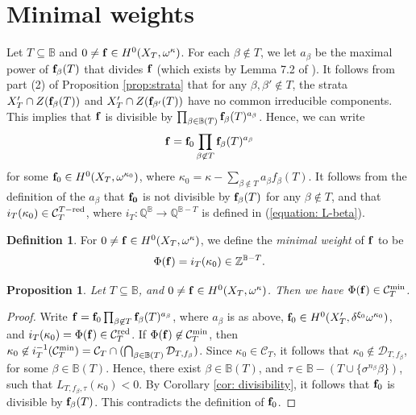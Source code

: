 \documentclass[11pt,pdflatex]{amsart}
\theoremstyle{plain}
\theoremstyle{definition}
\newcommand{\QQ}{\mathbf{Q}}
\newcommand{\ZZ}{\mathbf{Z}}
\theoremstyle{plain}
\newtheorem{prop}[theorem]{Proposition}
\theoremstyle{definition}
\newtheorem{dfn}[theorem]{Definition}
\theoremstyle{remark}
\numberwithin{equation}{section}
\numberwithin{figure}{section} \numberwithin{table}{subsection}
\newcommand{\calC}{{\mathcal{C}}}
\newcommand{\calD}{{\mathcal{D}}}
\def\BB{\mathbb{B}}
\def\QQ{\mathbb{Q}}
\def\ZZ{\mathbb{Z}}
\begin{document}
\section{Minimal weights}


 Let $T \subseteq \BB$ and $0 \neq {\bf f} \in H^0(X_T,\omega^\kappa)$. For each $\beta \not\in T$, we let $a_\beta$ be the maximal power of ${\bf f}_\beta(T)$ that divides $\bf f$ (which exists by Lemma 7.2 of \cite{DK2}).   
It follows from part (2) of Proposition \ref{prop:strata} that for any $\beta,\beta' \not\in T$, the strata $X'_T \cap Z({\bf f}_\beta(T))$ and $X'_T \cap Z({\bf f}_{\beta'}(T))$ have no common irreducible components.  This implies that ${\bf f}$ is divisible by $\prod_{\beta \in \BB(T)} {\bf f}_\beta(T)^{a_\beta}$. Hence, we can write 
$${\bf f} ={\bf f}_0\prod_{\beta \not\in T} {\bf f}_\beta(T)^{a_\beta}$$ 
for some ${\bf f}_0 \in H^0(X_T,\omega^{\kappa_0})$,
where $\kappa_0 = \kappa - \sum_{\beta\not\in T} a_\beta f_\beta(T)$.
It follows from the definition of the $a_\beta$ that $\bf f_0$ is not divisible by ${\bf f}_\beta(T)$ for any $\beta \not\in T$, and that $i_T(\kappa_0) \in \calC_T^{T-\rm red}$, where $i_T: \QQ^{\BB} \to \QQ^{\BB - T}$ is defined in (\ref{equation: L-beta}).

\begin{dfn}  For $0 \neq {\bf f} \in H^0(X_T,\omega^\kappa)$, we define the {\em minimal weight} of ${\bf f}$ to be
\[
\Phi({\bf f})=i_T(\kappa_0) \in \ZZ^{\BB- T}.
\]

\end{dfn}

\begin{prop} \label{prop: min weight} Let $T \subseteq \BB$, and $0 \neq {\bf f} \in H^0(X_T,\omega^\kappa)$. Then we have $\Phi({\bf f}) \in \calC^{\rm min}_T$.
\end{prop}
 \begin{proof} Write ${\bf f}={\bf f}_0\prod_{\beta \not\in T} {\bf f}_\beta(T)^{a_\beta}$, where  $a_\beta$ is as above, ${\bf f}_0 \in H^0(X'_T,\delta^{\xi_0}\omega^{\kappa_0})$, and $i_T(\kappa_0)=\Phi({\bf f}) \in \calC_T^{\rm red}$.  If $\Phi({\bf f})\not \in \calC^{\rm min}_T$, then $\kappa_0 \not\in  i_T^{-1}(\calC^{\rm min}_T)=\calC_T \cap (\bigcap_{\beta \in \BB(T)}  \calD_{T,f_\beta})$. Since $\kappa_0 \in \calC_T$, it follows that $\kappa_0 \not\in \calD_{T,f_\beta}$, for some $\beta \in \BB(T)$. Hence,  there exist $\beta \in \BB(T)$, and $\tau \in \BB-(T \cup\{\sigma^{n_\beta}\beta\})$, such that $L_{T,f_\beta,\tau}(\kappa_0)<0$. By Corollary \ref{cor: divisibility}, it follows that ${\bf f}_0$ is divisible by ${\bf f}_\beta(T)$. This contradicts the definition of ${\bf f}_0$.
\end{proof}
\end{document}
